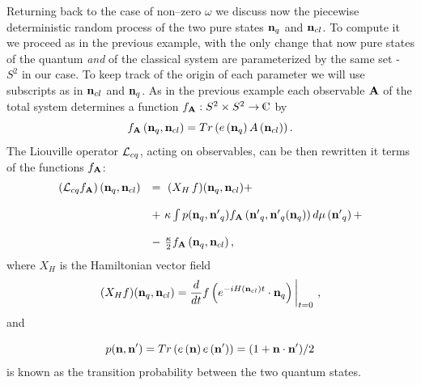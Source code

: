 \documentclass[12pt]{article}
\def\complex{{\kern .1em {\raise .47ex \hbox
{$\scriptscriptstyle
|$}}
\kern -.4em {\rm C}}}
\def\be{\begin{equation}} \def\ee{\end{equation}}
\begin{document}
Returning back to the case of non--zero $\omega$ we discuss now
the piecewise deterministic random process
of the two pure states ${\bf n}_q$ and
${\bf n}_{cl}$.  To compute it we proceed as in the previous example, 
with the
only change that now pure states of the quantum {\sl and} of the classical
system are parameterized by the same set - $S^2$ in our case.  To keep track of
the origin of each parameter we will use subscripts as in ${\bf n}_{cl}$ and
${\bf n}_{q}$.  As in the previous example each observable ${\bf A}$ of the
total
system determines a function $f_{\bf A}: S^2\times S^2\rightarrow\complex$ by
$$f_{\bf A}\left ({\bf n}_q, {\bf n}_{cl}\right)=Tr\left (e\left ({\bf
n}_q\right)A\left ({\bf n}_{cl}\right)\right). $$ 
The Liouville operator  ${\cal L}_{cq}$,  acting on observables,   can be then  
rewritten it terms of the functions  $f_{\bf A}$: 
 \be
 \begin{array}{ll}
\left ({\cal L}_{cq}f_{\bf A}\right)\left ({\bf n}_q, {\bf n}_{cl}\right)
& 
= \   (X_H\,  f) ({\bf n}_q, {\bf n}_{cl})  +
\cr\cr
& + \  \kappa\int p ({\bf n}_q, {\bf n'}_{q}) f_{\bf A}\left ({\bf n'}_{q}, 
{{\bf n'}_{q}} ({\bf n}_{q})\right)d\mu \left ({\bf n'}_{q}\right) +
\cr\cr
& - \ {\kappa\over 2} f_{\bf A}\left ({\bf n}_q, {\bf n}_{cl}\right), 
\end{array}
\ee
where $X_H$ is the Hamiltonian vector field
\be
 (X_H f) ({\bf n}_q, {\bf n}_{cl})={d\over dt}f\left (e^{-iH ({\bf n}_{cl})t}
\cdot {\bf n}_{q}
\right)\bigg\vert_{t=0} \  , 
\ee
and

\be
 p ({\bf n}, {\bf n'}) = Tr\left (e\left ({\bf n}\right)e\left ({\bf
n'}\right)\right)= (1+{\bf n\cdot n'})/2
\ee
is known as the transition probability between the two quantum states.
\end{document}
